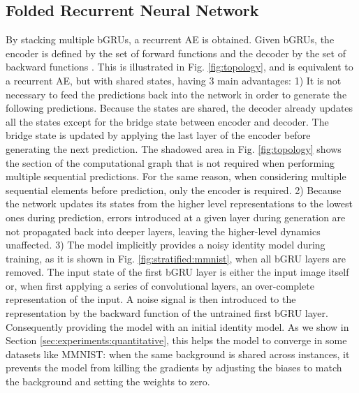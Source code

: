 \documentclass[runningheads]{llncs}
\begin{document}
\subsection{Folded Recurrent Neural Network}
\label{sec:method:frnn}

By stacking multiple bGRUs, a recurrent AE is obtained. Given  bGRUs, the encoder is defined by the set of forward functions  and the decoder by the set of backward functions . This is illustrated in Fig. \ref{fig:topology}, and is equivalent to a recurrent AE, but with shared states, having 3 main advantages: 1) It is not necessary to feed the predictions back into the network in order to generate the following predictions. Because the states are shared, the decoder already updates all the states except for the bridge state between encoder and decoder. The bridge state is updated by applying the last layer of the encoder before generating the next prediction. The shadowed area in Fig. \ref{fig:topology} shows the section of the computational graph that is not required when performing multiple sequential predictions. For the same reason, when considering multiple sequential elements before prediction, only the encoder is required. 2) Because the network updates its states from the higher level representations to the lowest ones during prediction, errors introduced at a given layer during generation are not propagated back into deeper layers, leaving the higher-level dynamics unaffected. 3) The model implicitly provides a noisy identity model during training, as it is shown in Fig. \ref{fig:stratified:mmnist}, when all bGRU layers are removed. The input state of the first bGRU layer is either the input image itself or, when first applying a series of convolutional layers, an over-complete representation of the input. A noise signal is then introduced to the representation by the backward function of the untrained first bGRU layer. Consequently providing the model with an initial identity model. As we show in Section \ref{sec:experiments:quantitative}, this helps the model to converge in some datasets like MMNIST: when the same background is shared across instances, it prevents the model from killing the gradients by adjusting the biases to match the background and setting the weights to zero.
\end{document}
